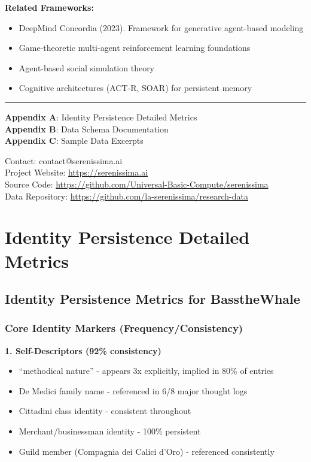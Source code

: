 \documentclass[11pt,a4paper]{article}
\begin{document}
\textbf{Related Frameworks:}
\begin{itemize}
\item DeepMind Concordia (2023). Framework for generative agent-based modeling
\item Game-theoretic multi-agent reinforcement learning foundations
\item Agent-based social simulation theory
\item Cognitive architectures (ACT-R, SOAR) for persistent memory
\end{itemize}

\vspace{0.5cm}
\hrule

\textbf{Appendix A}: Identity Persistence Detailed Metrics\\
\textbf{Appendix B}: Data Schema Documentation\\
\textbf{Appendix C}: Sample Data Excerpts

Contact: contact@serenissima.ai\\
Project Website: \url{https://serenissima.ai}\\
Source Code: \url{https://github.com/Universal-Basic-Compute/serenissima}\\
Data Repository: \url{https://github.com/la-serenissima/research-data}


\appendix

\section{Identity Persistence Detailed Metrics}

\subsection{Identity Persistence Metrics for BasstheWhale}

\subsubsection{Core Identity Markers (Frequency/Consistency)}

\textbf{1. Self-Descriptors (92\% consistency)}
\begin{itemize}
\item ``methodical nature'' - appears 3x explicitly, implied in 80\% of entries
\item De Medici family name - referenced in 6/8 major thought logs
\item Cittadini class identity - consistent throughout
\item Merchant/businessman identity - 100\% persistent
\item Guild member (Compagnia dei Calici d'Oro) - referenced consistently
\end{itemize}
\end{document}
